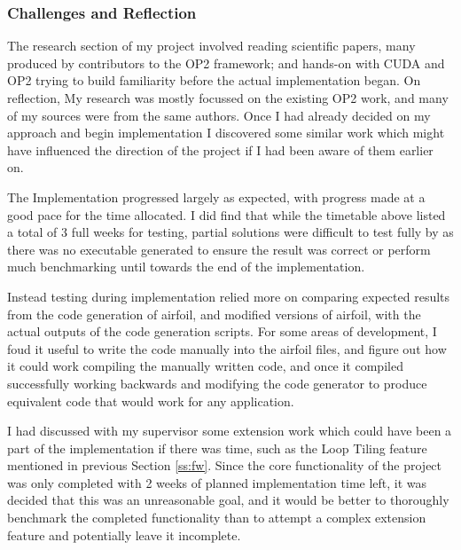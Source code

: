 \subsubsection{Challenges and Reflection}
\noindent {}
The research section of my project involved reading scientific papers, many produced by contributors to the OP2 framework; and hands-on with CUDA and OP2 trying to build familiarity before the actual implementation began. On reflection, My research was mostly focussed on the existing OP2 work, and many of my sources were from the same authors. Once I had already decided on my approach and begin implementation I discovered some similar work which might have influenced the direction of the project if I had been aware of them earlier on.

The Implementation progressed largely as expected, with progress made at a good pace for the time allocated. I did find that while the timetable above listed a total of 3 full weeks for testing, partial solutions were difficult to test fully by as there was no executable generated to ensure the result was correct or perform much benchmarking until towards the end of the implementation.
\par
Instead testing during implementation relied more on comparing expected results from the code generation of airfoil, and modified versions of airfoil, with the actual outputs of the code generation scripts. For some areas of development, I foud it useful to write the code manually into the airfoil files, and figure out how it could work compiling the manually written code, and once it compiled successfully working backwards and modifying the code generator to produce equivalent code that would work for any application.
\par
I had discussed with my supervisor some extension work which could have been a part of the implementation if there was time, such as the Loop Tiling feature mentioned in previous Section \ref{ss:fw}. Since the core functionality of the project was only completed with 2 weeks of planned implementation time left, it was decided that this was an unreasonable goal, and it would be better to thoroughly benchmark the completed functionality than to attempt a complex extension feature and potentially leave it incomplete.

